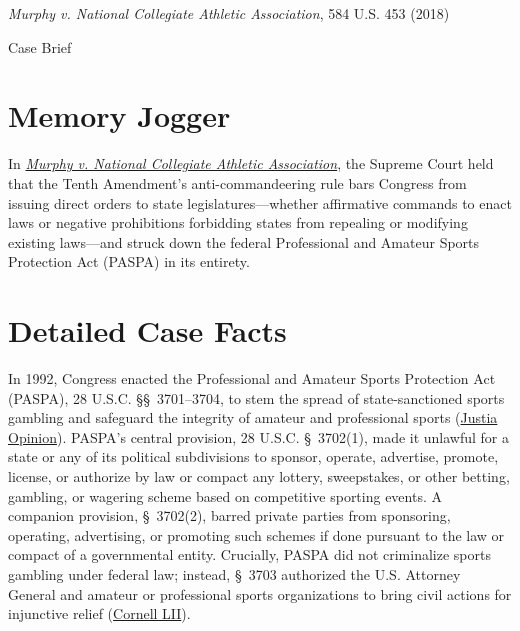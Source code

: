 \documentclass[12pt]{article}
\begin{document}
\begin{center}
{\LARGE \textit{Murphy v. National Collegiate Athletic Association}, 584 U.S. 453 (2018)\par}
\vspace{0.8em}
{\large Case Brief\par}
\end{center}
\vspace{1em}

\section{Memory Jogger}

In \href{https://www.courtlistener.com/opinion/4497655/murphy-v-national-collegiate-athletic-assn/}{\textit{Murphy v. National Collegiate Athletic Association}}, the Supreme Court held that the Tenth Amendment's anti-commandeering rule bars Congress from issuing direct orders to state legislatures---whether affirmative commands to enact laws or negative prohibitions forbidding states from repealing or modifying existing laws---and struck down the federal Professional and Amateur Sports Protection Act (PASPA) in its entirety.

\section{Detailed Case Facts}

In 1992, Congress enacted the Professional and Amateur Sports Protection Act (PASPA), 28 U.S.C. \S\S~3701--3704, to stem the spread of state-sanctioned sports gambling and safeguard the integrity of amateur and professional sports (\href{https://supreme.justia.com/cases/federal/us/584/16-476/}{Justia Opinion}). PASPA's central provision, 28 U.S.C. \S~3702(1), made it unlawful for a state or any of its political subdivisions to sponsor, operate, advertise, promote, license, or authorize by law or compact any lottery, sweepstakes, or other betting, gambling, or wagering scheme based on competitive sporting events. A companion provision, \S~3702(2), barred private parties from sponsoring, operating, advertising, or promoting such schemes if done pursuant to the law or compact of a governmental entity. Crucially, PASPA did not criminalize sports gambling under federal law; instead, \S~3703 authorized the U.S. Attorney General and amateur or professional sports organizations to bring civil actions for injunctive relief (\href{https://www.law.cornell.edu/supremecourt/text/16-476}{Cornell LII}).
\end{document}
